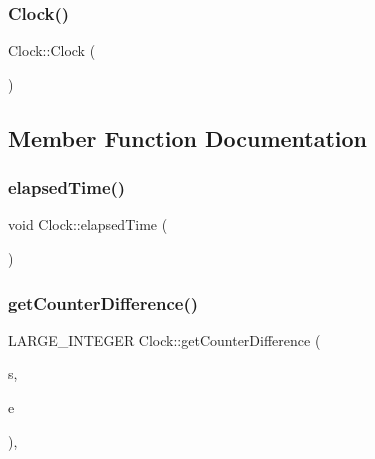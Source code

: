 \hypertarget{class_ori_engine_1_1_clock_adbc370eb6b5f8d01645cf440188160a8}{}\label{class_ori_engine_1_1_clock_adbc370eb6b5f8d01645cf440188160a8} 
\subsubsection{\texorpdfstring{Clock()}{Clock()}}
{\footnotesize\ttfamily Clock\+::\+Clock (\begin{DoxyParamCaption}{ }\end{DoxyParamCaption})\hspace{0.3cm}{\ttfamily [private]}}



\subsection{Member Function Documentation}
\hypertarget{class_ori_engine_1_1_clock_aa89ec268b0bb79f4caa36c4aa50980b8}{}\label{class_ori_engine_1_1_clock_aa89ec268b0bb79f4caa36c4aa50980b8} 
\subsubsection{\texorpdfstring{elapsed\+Time()}{elapsedTime()}}
{\footnotesize\ttfamily void Clock\+::elapsed\+Time (\begin{DoxyParamCaption}{ }\end{DoxyParamCaption})\hspace{0.3cm}{\ttfamily [static]}}

\hypertarget{class_ori_engine_1_1_clock_aace1360f2c2588f877a349af1b6e292e}{}\label{class_ori_engine_1_1_clock_aace1360f2c2588f877a349af1b6e292e} 
\subsubsection{\texorpdfstring{get\+Counter\+Difference()}{getCounterDifference()}}
{\footnotesize\ttfamily L\+A\+R\+G\+E\+\_\+\+I\+N\+T\+E\+G\+ER Clock\+::get\+Counter\+Difference (\begin{DoxyParamCaption}\item[{L\+A\+R\+G\+E\+\_\+\+I\+N\+T\+E\+G\+ER}]{s,  }\item[{L\+A\+R\+G\+E\+\_\+\+I\+N\+T\+E\+G\+ER}]{e }\end{DoxyParamCaption})\hspace{0.3cm}{\ttfamily [inline]}, {\ttfamily [static]}}

